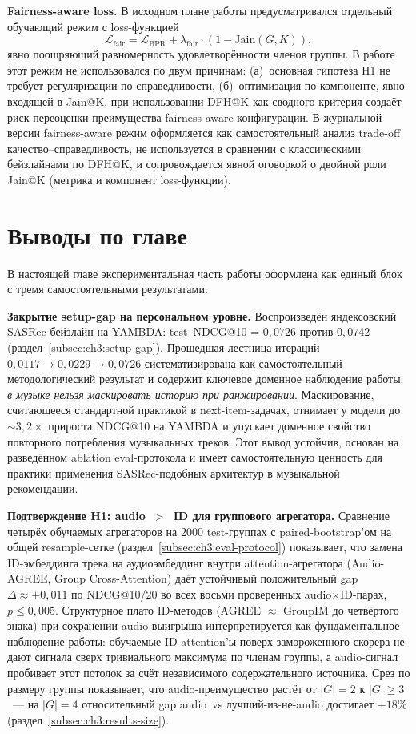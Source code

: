 \textbf{Fairness-aware loss.} В исходном плане работы предусматривался отдельный обучающий режим с loss-функцией
\begin{equation*}
    \mathcal{L}_{\mathrm{fair}} = \mathcal{L}_{\mathrm{BPR}} + \lambda_{\mathrm{fair}} \cdot \left( 1 - \mathrm{Jain}(G, K) \right),
\end{equation*}
явно поощряющий равномерность удовлетворённости членов группы. В работе этот режим не использовался по двум причинам: (а)~основная гипотеза H1 не требует регуляризации по справедливости, (б)~оптимизация по компоненте, явно входящей в Jain@K, при использовании DFH@K как сводного критерия создаёт риск переоценки преимущества fairness-aware конфигурации. В журнальной версии fairness-aware режим оформляется как самостоятельный анализ trade-off качество--справедливость, не используется в сравнении с классическими бейзлайнами по DFH@K, и сопровождается явной оговоркой о двойной роли Jain@K (метрика и компонент loss-функции).

\section{Выводы по главе}\label{sec:ch3:conclusion}

В настоящей главе экспериментальная часть работы оформлена как единый блок с тремя самостоятельными результатами.

\textbf{Закрытие setup-gap на персональном уровне.} Воспроизведён яндексовский SASRec-бейзлайн на YAMBDA: test~NDCG@10 = $0{,}0726$ против $0{,}0742$ (раздел~\ref{subsec:ch3:setup-gap}). Прошедшая лестница итераций $0{,}0117 \to 0{,}0229 \to 0{,}0726$ систематизирована как самостоятельный методологический результат и содержит ключевое доменное наблюдение работы: \emph{в музыке нельзя маскировать историю при ранжировании}. Маскирование, считающееся стандартной практикой в next-item-задачах, отнимает у модели до $\sim$$3{,}2\times$ прироста NDCG@10 на YAMBDA и упускает доменное свойство повторного потребления музыкальных треков. Этот вывод устойчив, основан на разведённом ablation eval-протокола и имеет самостоятельную ценность для практики применения SASRec-подобных архитектур в музыкальной рекомендации.

\textbf{Подтверждение H1: audio~$>$~ID для группового агрегатора.} Сравнение четырёх обучаемых агрегаторов на $2000$ test-группах с paired-bootstrap'ом на общей resample-сетке (раздел~\ref{subsec:ch3:eval-protocol}) показывает, что замена ID-эмбеддинга трека на аудиоэмбеддинг внутри attention-агрегатора (Audio-AGREE, Group Cross-Attention) даёт устойчивый положительный gap $\Delta \approx +0{,}011$ по NDCG@10/20 во всех восьми проверенных audio${\times}$ID-парах, $p \leq 0{,}005$. Структурное плато ID-методов (AGREE $\approx$ GroupIM до четвёртого знака) при сохранении audio-выигрыша интерпретируется как фундаментальное наблюдение работы: обучаемые ID-attention'ы поверх замороженного скорера не дают сигнала сверх тривиального максимума по членам группы, а audio-сигнал пробивает этот потолок за счёт независимого содержательного источника. Срез по размеру группы показывает, что audio-преимущество растёт от $|G| = 2$ к $|G| \geq 3$~--- на $|G| = 4$ относительный gap audio~vs лучший-из-не-audio достигает $+18\%$ (раздел~\ref{subsec:ch3:results-size}).

